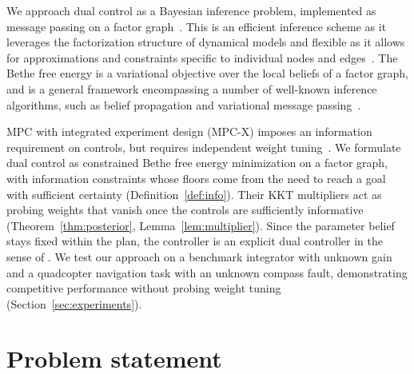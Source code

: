 \documentclass{l4dc2027}
\begin{document}
We approach dual control as a Bayesian inference problem, implemented as message passing on a factor graph~\citep{loeliger2007factor}. This is an efficient inference scheme as it leverages the factorization structure of dynamical models and flexible as it allows for approximations and constraints specific to individual nodes and edges~\citep{levine2018reinforcement,hoffmann2017linear}. The Bethe free energy is a variational objective over the local beliefs of a factor graph, and is a general framework encompassing a number of well-known inference algorithms, such as belief propagation and variational message passing~\citep{yedidia2005constructing,csenoz2021variational}. 

MPC with integrated experiment design (MPC-X) imposes an information requirement on controls, but requires independent weight tuning~\citep{larsson2013model}. We formulate dual control as constrained Bethe free energy minimization on a factor graph, with information constraints whose floors come from the need to reach a goal with sufficient certainty (Definition~\ref{def:info}). Their KKT multipliers act as probing weights that vanish once the controls are sufficiently informative (Theorem~\ref{thm:posterior}, Lemma~\ref{lem:multiplier}). Since the parameter belief stays fixed within the plan, the controller is an explicit dual controller in the sense of \citet{mesbah2018stochastic}. We test our approach on a benchmark integrator with unknown gain and a quadcopter navigation task with an unknown compass fault, demonstrating competitive performance without probing weight tuning (Section~\ref{sec:experiments}). 

\section{Problem statement}\label{sec:problem}
\end{document}
